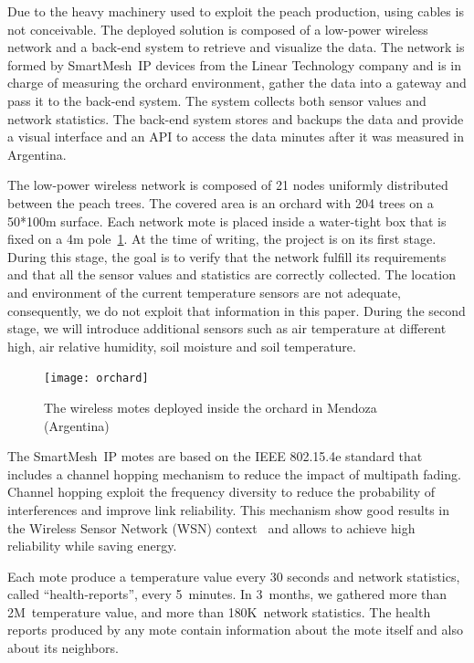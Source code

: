 \documentclass{sig-alternate}
\newcommand{\smip}                  {SmartMesh~IP\xspace}
\begin{document}

Due to the heavy machinery used to exploit the peach production, using cables is not conceivable.
The deployed solution is composed of a low-power wireless network and a back-end system to retrieve and visualize the data.
The network is formed by \smip devices from the Linear Technology company and is in charge of measuring the orchard environment, gather the data into a gateway and pass it to the back-end system.
The system collects both sensor values and network statistics.
The back-end system stores and backups the data and provide a visual interface and an API to access the data minutes after it was measured in Argentina.


The low-power wireless network is composed of 21 nodes uniformly distributed between the peach trees.
The covered area is an orchard with 204 trees on a 50*100m surface.
Each network mote is placed inside a water-tight box that is fixed on a 4m pole~\ref{fig:orchard}.
At the time of writing, the project is on its first stage.
During this stage, the goal is to verify that the network fulfill its requirements and that all the sensor values and statistics are correctly collected.
The location and environment of the current temperature sensors are not adequate, consequently, we do not exploit that information in this paper.
During the second stage, we will introduce additional sensors such as air temperature at different high, air relative humidity, soil moisture and soil temperature.

\begin{figure}
    \centering
    \texttt{[image: orchard]}
    \caption{The wireless motes deployed inside the orchard in Mendoza (Argentina)}
    \label{fig:orchard}
\end{figure}


The \smip motes are based on the IEEE 802.15.4e standard that includes a channel hopping mechanism to reduce the impact of multipath fading.
Channel hopping exploit the frequency diversity to reduce the probability of interferences and improve link reliability.
This mechanism show good results in the Wireless Sensor Network (WSN) context~\cite{watteyne2010mitigating, watteyne2009reliability} and allows to achieve high reliability while saving energy.


Each mote produce a temperature value every 30 seconds and network statistics, called ``health-reports'', every 5~minutes.
In 3~months, we gathered more than 2M~temperature value, and more than 180K~network statistics.
The health reports produced by any mote contain information about the mote itself and also about its neighbors.
\end{document}
